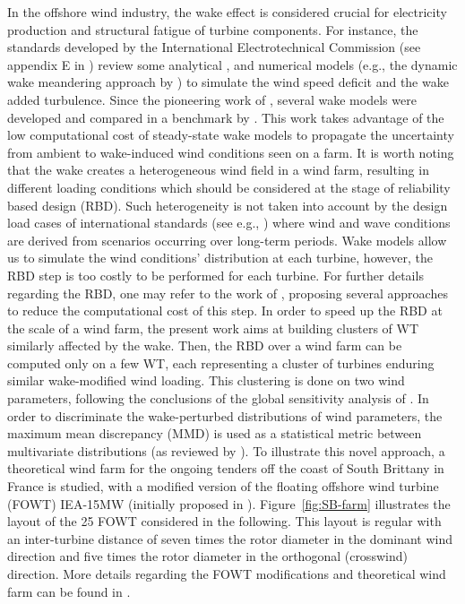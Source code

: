 In the offshore wind industry, the wake effect is considered crucial for electricity production and structural fatigue of turbine components. 
For instance, the standards developed by the International Electrotechnical Commission (see appendix E in \cite{IEC61400-1}) review some analytical \cite{Frandsen2007}, and numerical models (e.g., the dynamic wake meandering approach by \cite{Larsen2008}) to simulate the wind speed deficit and the wake added turbulence. 
Since the pioneering work of \cite{Jensen1983}, several wake models were developed and compared in a benchmark by \cite{Doubrawa2020}. 
This work takes advantage of the low computational cost of steady-state wake models to propagate the uncertainty from ambient to wake-induced wind conditions seen on a farm. 
It is worth noting that the wake creates a heterogeneous wind field in a wind farm, resulting in different loading conditions which should be considered at the stage of reliability based design (RBD). 
Such heterogeneity is not taken into account by the design load cases of international standards (see e.g., \cite{IEC61400-1,DNV-OS-J103}) where wind and wave conditions are derived from scenarios occurring over long-term periods. 
Wake models allow us to simulate the wind conditions' distribution at each turbine, however, the RBD step is too costly to be performed for each turbine. 
For further details regarding the RBD, one may refer to the work of \cite{huchet_2019, slot_sorensen_2020, stieng_muskulus_2020, wilkie_galasso_2021}, proposing several approaches to reduce the computational cost of this step. 
In order to speed up the RBD at the scale of a wind farm, the present work aims at building clusters of WT similarly affected by the wake. 
Then, the RBD over a wind farm can be computed only on a few WT, each representing a cluster of turbines enduring similar wake-modified wind loading. This clustering is done on two wind parameters, following the conclusions of the global sensitivity analysis of \cite{McWilliam2022}. 
In order to discriminate the wake-perturbed distributions of wind parameters, the maximum mean discrepancy (MMD) is used as a statistical metric between multivariate distributions (as reviewed by \cite{Sriperumbudur2010}). 
To illustrate this novel approach, a theoretical wind farm for the ongoing tenders off the coast of South Brittany in France is studied, with a modified version of the floating offshore wind turbine (FOWT) IEA-15MW (initially proposed in \cite{Allen2020,Gaertner2020}). 
Figure~\ref{fig:SB-farm} illustrates the layout of the 25 FOWT considered in the following. 
This layout is regular with an inter-turbine distance of seven times the rotor diameter in the dominant wind direction and five times the rotor diameter in the orthogonal (crosswind) direction. 
More details regarding the FOWT modifications and theoretical wind farm can be found in \cite{Capaldo2021,Peyrard2022}.

